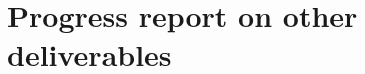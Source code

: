 \documentclass{beamer}
\begin{document}

  



\section{Progress report on other deliverables}
\end{document}

